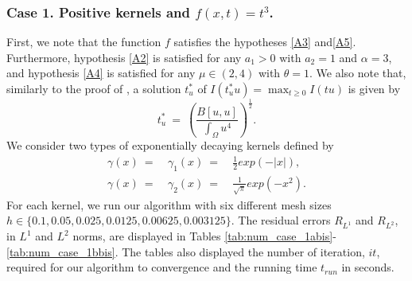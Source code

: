 \documentclass[11pt]{amsart}   	%
\theoremstyle{plain}
\numberwithin{equation}{section}
\begin{document}
\subsubsection{Case 1. Positive kernels and $f(x,t) = t^3$.}
First, we note that the function $f$ satisfies the hypotheses \ref{A3} and\ref{A5}. Furthermore, hypothesis \ref{A2} is satisfied for any $a_1>0$ with $a_2=1$ and $\alpha=3$, and hypothesis \ref{A4} is satisfied for any $\mu\in(2,4)$ with $\theta=1$. We also note that, similarly to the proof of \cite[Lemma 4]{bailova2021mountain}, a solution $t^*_u$ of $I(t^*_u u)  = \max_{t\geq 0} I(tu)$ is given by
$$t^*_u \ = \ \left( \frac{B[u,u]}{\int_\Omega u^4} \right)^{\frac{1}{2}}.$$
We consider two types of exponentially decaying kernels defined by
$$
\begin{array}{ccl}
 \gamma(x) \ = \    &  \gamma_1(x) \ = \ & \frac{1}{2} exp(-|x|),  \\
 \gamma(x) \ = \   &  \gamma_2(x) \ = \ & \frac{1}{\sqrt{\pi}} exp(-x^2). 
\end{array}
$$
For each kernel, we run our algorithm with six different mesh sizes $h\in \{0.1, 0.05, 0.025, 0.0125, 0.00625, 0.003125\}$. The residual errors $R_{L^1}$ and $R_{L^2}$, in $L^1$ and $L^2$ norms, are displayed in Tables \ref{tab:num_case_1abis}-\ref{tab:num_case_1bbis}. The tables also displayed the number of iteration, $it$, required for our algorithm to convergence and the running time $t_{run}$ in seconds.
\end{document}
